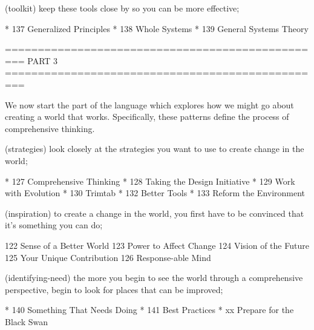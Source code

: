 (toolkit) keep these tools close by so you can be more effective;

*	137  Generalized Principles
*	138  Whole Systems
*	139  General Systems Theory


=================================================
 PART 3
=================================================

We now start the part of the language which explores how we might go about creating a world that works. Specifically, these patterns define the process of comprehensive thinking.



(strategies) look closely at the strategies you want to use to create change in the world;

*	127  Comprehensive Thinking
*	128  Taking the Design Initiative
*	129  Work with Evolution
*	130  Trimtab
*	132  Better Tools
*	133  Reform the Environment


(inspiration) to create a change in the world, you first have to be convinced that it's something you can do;

	122  Sense of a Better World
	123  Power to Affect Change
	124  Vision of the Future
	125  Your Unique Contribution
	126  Response-able Mind

(identifying-need) the more you begin to see the world through a comprehensive perspective, begin to look for places that can be improved;

*	140  Something That Needs Doing
*	141  Best Practices
*	xx  Prepare for the Black Swan   %

